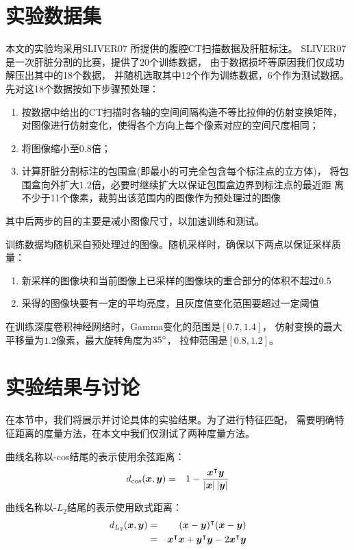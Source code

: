 
\section{实验数据集}
本文的实验均采用SLIVER07\cite{heimann2009comparison}
所提供的腹腔CT扫描数据及肝脏标注。
SLIVER07是一次肝脏分割的比赛，提供了20个训练数据，
由于数据损坏等原因我们仅成功解压出其中的18个数据，
并随机选取其中12个作为训练数据，6个作为测试数据。
先对这18个数据按如下步骤预处理：
\begin{enumerate}
    \item 按数据中给出的CT扫描时各轴的空间间隔构造不等比拉伸的仿射变换矩阵，
        对图像进行仿射变化，使得各个方向上每个像素对应的空间尺度相同；
    \item 将图像缩小至$0.8$倍；
    \item 计算肝脏分割标注的包围盒(即最小的可完全包含每个标注点的立方体)，
        将包围盒向外扩大$1.2$倍，必要时继续扩大以保证包围盒边界到标注点的最近距
        离不少于11个像素，裁剪出该范围内的图像作为预处理过的图像
\end{enumerate}
其中后两步的目的主要是减小图像尺寸，以加速训练和测试。

训练数据均随机采自预处理过的图像。随机采样时，确保以下两点以保证采样质量：
\begin{enumerate}
    \item 新采样的图像块和当前图像上已采样的图像块的重合部分的体积不超过$0.5$
    \item 采得的图像块要有一定的平均亮度，且灰度值变化范围要超过一定阈值
\end{enumerate}

在训练深度卷积神经网络时，Gamma变化的范围是$[0.7, 1.4]$，
仿射变换的最大平移量为$1.2$像素，最大旋转角度为$35\degree$，
拉伸范围是$[0.8, 1.2]$。


\section{实验结果与讨论}
在本节中，我们将展示并讨论具体的实验结果。为了进行特征匹配，
需要明确特征距离的度量方法，在本文中我们仅测试了两种度量方法。

曲线名称以-cos结尾的表示使用余弦距离：
\begin{eqnarray}
    d_{\cos}(\boldsymbol{x}, \boldsymbol{y}) &=& 1 -
        \frac{\boldsymbol{x}^\intercal\boldsymbol{y}}{\left|\boldsymbol{x}\right|\left|\boldsymbol{y}\right|}
\end{eqnarray}

曲线名称以-$L_2$结尾的表示使用欧式距离：
\begin{eqnarray}
    d_{L_2}(\boldsymbol{x}, \boldsymbol{y}) &=&
        (\boldsymbol{x}-\boldsymbol{y})^\intercal(\boldsymbol{x}-\boldsymbol{y}) \nonumber \\
        &=& \boldsymbol{x}^\intercal\boldsymbol{x} + \boldsymbol{y}^\intercal\boldsymbol{y} -
        2\boldsymbol{x}^\intercal\boldsymbol{y}
\end{eqnarray}

